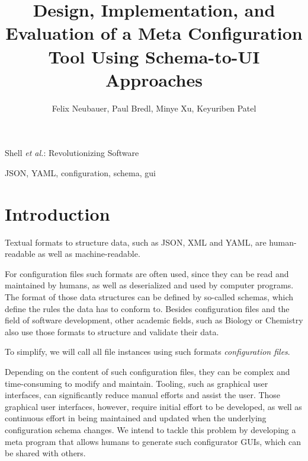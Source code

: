 \documentclass[lettersize,journal]{IEEEtran}
\newcommand{\cfgfiles}{configuration files}
\begin{document}
 \title{Design, Implementation, and Evaluation of a Meta Configuration Tool Using Schema-to-UI Approaches}
 \author{Felix Neubauer, Paul Bredl, Minye Xu, Keyuriben Patel}

 {Shell \MakeLowercase{\textit{et al.}}: Revolutionizing Software}


 \maketitle

 \begin{abstract}
 \end{abstract}

 \begin{IEEEkeywords}
  JSON, YAML, configuration, schema, gui
 \end{IEEEkeywords}


 \section{Introduction}\label{sec:introduction} %

 Textual formats to structure data, such as JSON, XML and YAML, are human-readable as well as machine-readable.

 For configuration files such formats are often used, since they can be read and maintained by humans, as well as deserialized and used by computer programs.
 The format of those data structures can be defined by so-called schemas, which define the rules the data has to conform to.
 Besides configuration files and the field of software development, other academic fields, such as Biology or Chemistry also use those formats to structure and validate their data.

 To simplify, we will call all file instances using such formats \textit{\cfgfiles}.

 Depending on the content of such \cfgfiles, they can be complex and time-consuming to modify and maintain.
 Tooling, such as graphical user interfaces, can significantly reduce manual efforts and assist the user.
 Those graphical user interfaces, however, require initial effort to be developed, as well as continuous effort in being maintained and updated when the underlying configuration schema changes.
 We intend to tackle this problem by developing a meta program that allows humans to generate such configurator GUIs, which can be shared with others.
\end{document}
